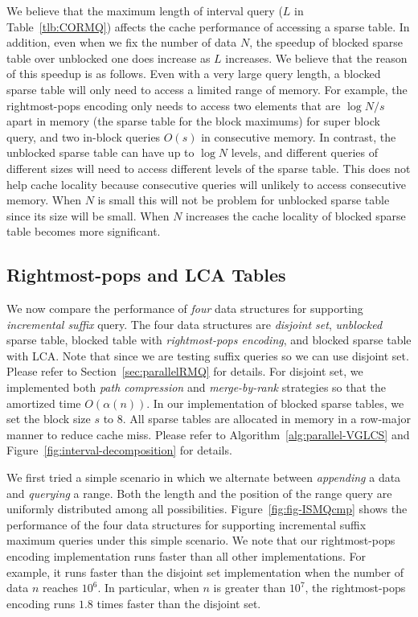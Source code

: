 We believe that the maximum length of interval query ($L$ in
Table~\ref{tlb:CORMQ}) affects the cache performance of accessing a
sparse table.  In addition, even when we fix the number of data $N$,
the speedup of blocked sparse table over unblocked one does increase
as $L$ increases.  We believe that the reason of this speedup is as
follows.  Even with a very large query length, a blocked sparse table
will only need to access a limited range of memory.  For example, the
rightmost-pops encoding only needs to access two elements that are
$\log {N/s}$ apart in memory (the sparse table for the block maximums)
for super block query, and two in-block queries $O(s)$ in consecutive
memory.  In contrast, the unblocked sparse table can have up to $\log
N$ levels, and different queries of different sizes will need to
access different levels of the sparse table.  This does not help cache
locality because consecutive queries will unlikely to access
consecutive memory.  When $N$ is small this will not be problem for
unblocked sparse table since its size will be small.  When $N$
increases the cache locality of blocked sparse table becomes more
significant.




\subsection{Rightmost-pops and LCA Tables}

We now compare the performance of {\em four} data structures for
supporting {\em incremental suffix} query.  The four data structures
are {\em disjoint set}, {\em unblocked} sparse table, blocked table
with {\em rightmost-pops encoding}, and blocked sparse table with
LCA. Note that since we are testing suffix queries so we can use
disjoint set.  Please refer to Section~\ref{sec:parallelRMQ} for
details. For disjoint set, we implemented both {\em path compression}
and {\em merge-by-rank} strategies so that the amortized time
$O(\alpha(n))$. In our implementation of blocked sparse tables, we set
the block size $s$ to $8$.  All sparse tables are allocated in memory
in a row-major manner to reduce cache miss.  Please refer to
Algorithm~\ref{alg:parallel-VGLCS} and
Figure~\ref{fig:interval-decomposition} for details.


We first tried a simple scenario in which we alternate between {\em
  appending} a data and {\em querying} a range.  Both the length and
the position of the range query are uniformly distributed among all
possibilities.  Figure~\ref{fig:fig-ISMQcmp} shows the performance of
the four data structures for supporting incremental suffix maximum
queries under this simple scenario.  We note that our rightmost-pops
encoding implementation runs faster than all other
implementations. For example, it runs faster than the disjoint set
implementation when the number of data $n$ reaches $10^6$.  In
particular, when $n$ is greater than $10^7$, the rightmost-pops
encoding runs $1.8$ times faster than the disjoint set.


